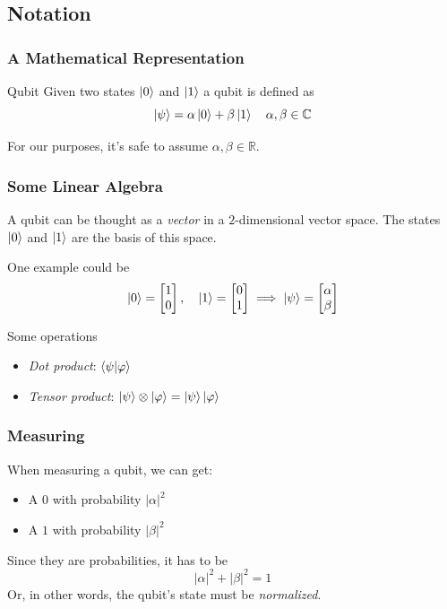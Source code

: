 \documentclass{beamer}
\begin{document}
  \subsection{Notation}
  \begin{frame}
    \frametitle{A Mathematical Representation}
    \begin{block}{Qubit}
      Given two states $\ket{0}$ and $\ket{1}$ a qubit is defined as
      \begin{equation*}
        \ket{\psi} = \alpha\ket{0} + \beta\ket{1} \quad \alpha,\beta\in\mathbb C
      \end{equation*}
    \end{block}

    For our purposes, it's safe to assume $\alpha,\beta\in\mathbb R$.
  \end{frame}
  \begin{frame}
    \frametitle{Some Linear Algebra}
    A qubit can be thought as a \textit{vector} in a $2$-dimensional vector space.
    The states $\ket 0$ and $\ket 1$ are the basis of this space.

    One example could be
    \begin{equation*}
      \ket{0} = \begin{bmatrix} 1 \\ 0 \end{bmatrix},
      \quad
      \ket{1} = \begin{bmatrix} 0 \\ 1 \end{bmatrix}
      \implies
      \ket{\psi} = \begin{bmatrix} \alpha \\ \beta \end{bmatrix}
    \end{equation*}

    Some operations
    \begin{itemize}
      \item \textit{Dot product}: $\braket{\psi|\varphi}$
      \item \textit{Tensor product}: $\ket{\psi}\otimes\ket{\varphi} = \ket{\psi}\ket{\varphi}$
    \end{itemize}
  \end{frame}
  \begin{frame}
    \frametitle{Measuring}
    When measuring a qubit, we can get:
    \begin{itemize}
      \item A $0$ with probability $|\alpha|^2$
      \item A $1$ with probability $|\beta|^2$
    \end{itemize}

    Since they are probabilities, it has to be
    \begin{equation*}
      |\alpha|^2 + |\beta|^2 = 1
    \end{equation*}
    Or, in other words, the qubit's state must be \textit{normalized}.
  \end{frame}
\end{document}
